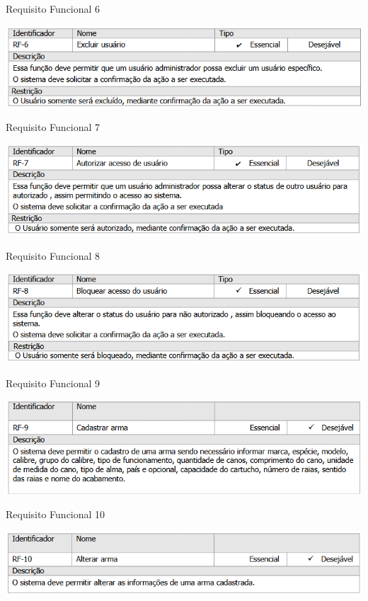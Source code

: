\begin{table}[H]
    \caption{Requisito Funcional 6}\label{tab:rf06}
    \centering
    \includegraphics[scale=0.8]{imagens/rf06.png}
\end{table}
\begin{table}[H]
    \caption{Requisito Funcional 7}\label{tab:rf07}
    \centering
    \includegraphics[scale=0.8]{imagens/rf07.png}
\end{table}
\begin{table}[H]
    \caption{Requisito Funcional 8}\label{tab:rf08}
    \centering
    \includegraphics[scale=0.8]{imagens/rf08.png}
\end{table}
\begin{table}[H]
    \caption{Requisito Funcional 9}\label{tab:rf09}
    \centering
    \includegraphics[scale=0.8]{imagens/rf09.png}
\end{table}
\begin{table}[H]
    \caption{Requisito Funcional 10}\label{tab:rf10}
    \centering
    \includegraphics[scale=0.8]{imagens/rf10.png}
\end{table}
